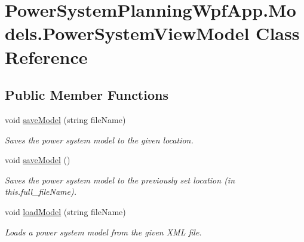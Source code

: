\hypertarget{class_power_system_planning_wpf_app_1_1_models_1_1_power_system_view_model}{}\section{Power\+System\+Planning\+Wpf\+App.\+Models.\+Power\+System\+View\+Model Class Reference}
\label{class_power_system_planning_wpf_app_1_1_models_1_1_power_system_view_model}
\subsection*{Public Member Functions}
\begin{DoxyCompactItemize}
\item 
void \hyperlink{class_power_system_planning_wpf_app_1_1_models_1_1_power_system_view_model_abda279482100378e9dba53ad4f741c1c}{save\+Model} (string file\+Name)
\begin{DoxyCompactList}\small\item\em Saves the power system model to the given location. \end{DoxyCompactList}\item 
void \hyperlink{class_power_system_planning_wpf_app_1_1_models_1_1_power_system_view_model_addc9f5e96c8838056a1abe5d619b9d7e}{save\+Model} ()
\begin{DoxyCompactList}\small\item\em Saves the power system model to the previously set location (in \textquotesingle{}this.\+full\+\_\+file\+Name\textquotesingle{}). \end{DoxyCompactList}\item 
void \hyperlink{class_power_system_planning_wpf_app_1_1_models_1_1_power_system_view_model_aa64bb0e541cc576eb77355958376915e}{load\+Model} (string file\+Name)
\begin{DoxyCompactList}\small\item\em Loads a power system model from the given X\+ML file. \end{DoxyCompactList}\end{DoxyCompactItemize}
